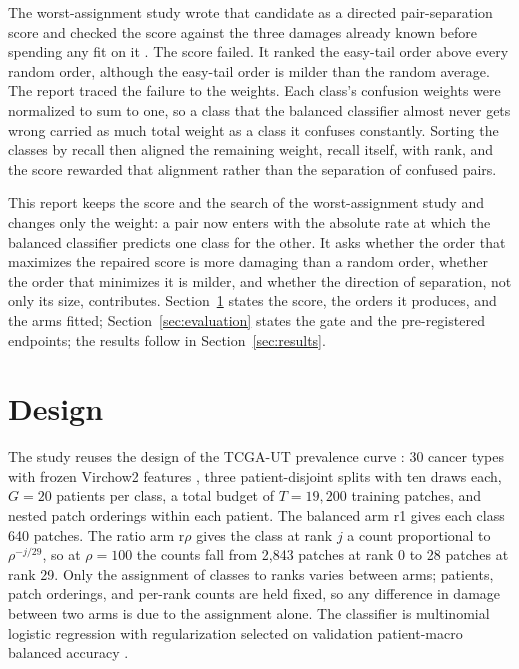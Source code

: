 \documentclass[11pt]{article}
\begin{document}
The worst-assignment study wrote that candidate as a directed pair-separation score and checked the score against the three damages already known before spending any fit on it \citep{queisler2026worstTcga}. The score failed. It ranked the easy-tail order above every random order, although the easy-tail order is milder than the random average. The report traced the failure to the weights. Each class's confusion weights were normalized to sum to one, so a class that the balanced classifier almost never gets wrong carried as much total weight as a class it confuses constantly. Sorting the classes by recall then aligned the remaining weight, recall itself, with rank, and the score rewarded that alignment rather than the separation of confused pairs.

This report keeps the score and the search of the worst-assignment study and changes only the weight: a pair now enters with the absolute rate at which the balanced classifier predicts one class for the other. It asks whether the order that maximizes the repaired score is more damaging than a random order, whether the order that minimizes it is milder, and whether the direction of separation, not only its size, contributes. Section~\ref{sec:design} states the score, the orders it produces, and the arms fitted; Section~\ref{sec:evaluation} states the gate and the pre-registered endpoints; the results follow in Section~\ref{sec:results}.

\section{Design}
\label{sec:design}
The study reuses the design of the TCGA-UT prevalence curve \citep{queisler2026prevalenceTcga}: 30 cancer types with frozen Virchow2 features \citep{zimmermann2024virchow2}, three patient-disjoint splits with ten draws each, $G=20$ patients per class, a total budget of $T=19{,}200$ training patches, and nested patch orderings within each patient. The balanced arm r1 gives each class 640 patches. The ratio arm r$\rho$ gives the class at rank $j$ a count proportional to $\rho^{-j/29}$, so at $\rho=100$ the counts fall from 2,843 patches at rank 0 to 28 patches at rank 29. Only the assignment of classes to ranks varies between arms; patients, patch orderings, and per-rank counts are held fixed, so any difference in damage between two arms is due to the assignment alone. The classifier is multinomial logistic regression with regularization selected on validation patient-macro balanced accuracy \citep{queisler2026patientShortage}.
\end{document}
